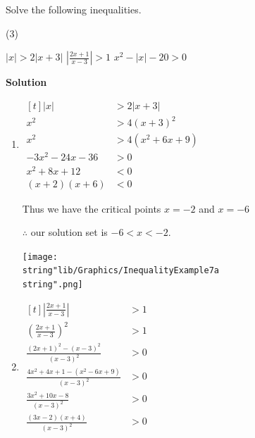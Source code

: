 \documentclass[11pt,a4paper]{book}
\begin{document}
\begin{example}

Solve the following inequalities.
\begin{tasks}[label=(\alph*),label-width=3.5ex](3)

\task $\left|x\right|>2\left|x+3\right|$
\task ${\displaystyle \left|\frac{2x+1}{x-3}\right|>1}$
\task $x^{2}-\left|x\right|-20>0$

\end{tasks}

\textbf{Solution}
\begin{enumerate}[label=(\alph*),itemsep=1cm]

\item
$
\begin{aligned}[t]
\left|x\right| & >2\left|x+3\right|\\
x^{2} & >4\left(x+3\right)^{2}\\
x^{2} & >4\left(x^{2}+6x+9\right)\\
-3x^{2}-24x-36 & >0\\
x^{2}+8x+12 & <0\\
\left(x+2\right)\left(x+6\right) & <0
\end{aligned}
$


\begin{minipage}[t]{0.58\textwidth} 

Thus we have the critical points $x=-2$ and $x=-6$

$\therefore$ our solution set is $-6<x<-2$.

\end{minipage}
\begin{minipage}[t]{0.4\textwidth} 
\begin{center}
\texttt{[image: \\string"lib/Graphics/InequalityExample7a\\string".png]}
\par\end{center}
\end{minipage}

\item
$
\begin{aligned}[t]
{\displaystyle \left|\frac{2x+1}{x-3}\right|} & >1\\
{\displaystyle \left(\frac{2x+1}{x-3}\right)^{2}} & >1\\
\frac{\left(2x+1\right)^{2}-\left(x-3\right)^{2}}{\left(x-3\right)^{2}} & >0\\
\frac{4x^{2}+4x+1-\left(x^{2}-6x+9\right)}{\left(x-3\right)^{2}} & >0\\
\frac{3x^{2}+10x-8}{\left(x-3\right)^{2}} & >0\\
\frac{\left(3x-2\right)\left(x+4\right)}{\left(x-3\right)^{2}} & >0
\end{aligned}
$


\end{enumerate}
\end{example}
\end{document}
